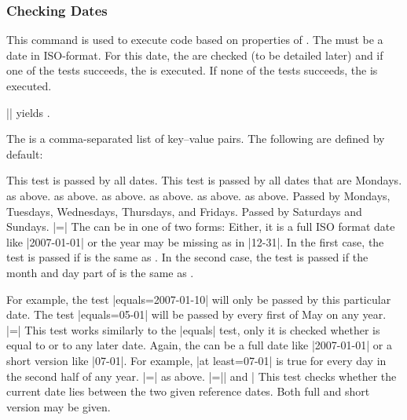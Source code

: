 \subsubsection{Checking Dates}

\begin{command}{\pgfcalendarifdate{}}
\label{pgfcalendarifdate}
    This command is used to execute code based on properties of .
    The  must be a date in ISO-format. For this date, the
     are checked (to be detailed later) and if one of the tests
    succeeds, the  is executed. If none of the tests succeeds, the
     is executed.

    \example ||
    yields \texttt{}.

    The  is a comma-separated list of key--value pairs. The
    following are defined by default:
    \begin{itemize}
         This test is passed by all dates.
         This test is passed by all dates that are
            Mondays.
         as above.
         as above.
         as above.
         as above.
         as above.
         as above.
         Passed by Mondays, Tuesdays, Wednesdays,
            Thursdays, and Fridays.  Passed by
            Saturdays and Sundays.
            |=| The 
            can be in one of two forms: Either, it is a full ISO format date
            like |2007-01-01| or the year may be missing as in |12-31|. In the
            first case, the test is passed if  is the same as
            . In the second case, the test is passed if the
            month and day part of  is the same as .

            For example, the test |equals=2007-01-10| will only be passed by
            this particular date. The test |equals=05-01| will be passed by
            every first of May on any year.
        |=| This test works
            similarly to the |equals| test, only it is checked whether
             is equal to  or to any later date.
            Again, the  can be a full date like |2007-01-01| or
            a short version like |07-01|. For example, |at least=07-01| is true
            for every day in the second half of any year.
        |=| as above.
        |=|| and | This test checks whether the current date lies between
            the two given reference dates. Both full and short version may be
            given.


\end{itemize}
\end{command}
